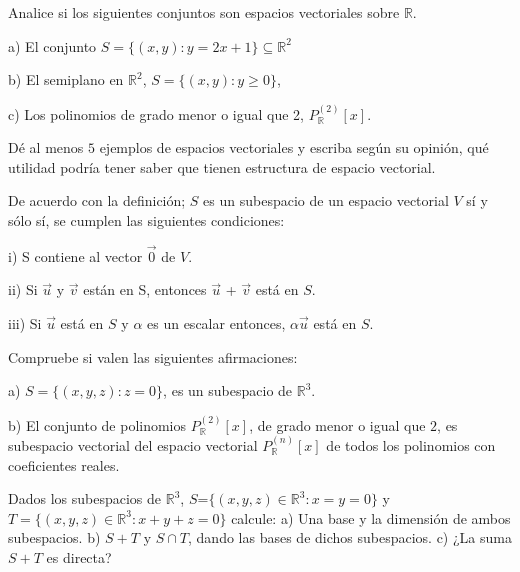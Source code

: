 \begin{exercise}
\item
Analice si los siguientes conjuntos son espacios vectoriales
sobre $\mathbb{R}$. 

a) El conjunto  $S=\{(x,y) : y=2x+1\}
\subseteq \mathbb{R}^2$

b) El semiplano en $\mathbb{R}^2$,  $S=\{(x,y) : y\geq 0\}$, 

c) Los polinomios de grado menor o igual que 2, $P^{(2)}_{\mathbb{R}}[x]$.

\end{exercise}



\begin{exercise}
\item
Dé al menos $5$ ejemplos de espacios vectoriales y escriba según su opinión, 
qué utilidad podría tener saber que tienen estructura de espacio vectorial.
\end{exercise}
\begin{exercise}
\item 

De acuerdo con la definición; $S$ es un subespacio de un espacio vectorial $V$ sí 
y sólo sí, se cumplen las siguientes condiciones:

i) S contiene al vector $\vec{0}$ de $V$.

ii) Si $\vec{u}$ y $\vec{v}$ están en S, entonces $\vec{u}$  + $\vec{v}$ está en $S$.

iii) Si $\vec{u}$ está en $S$ y $\alpha$ es un escalar entonces, $\alpha\vec{u}$ está en $S$.

\noindent Compruebe si valen las siguientes afirmaciones:

\noindent a) $S=\{(x,y,z) : z=0\}$, es un subespacio de $\mathbb{R}^3$.

\noindent b) El conjunto de polinomios $P^{(2)}_{\mathbb{R}}[x]$, de grado menor o igual que $2$, es subespacio vectorial del espacio vectorial 
$P^{(n)}_{\mathbb{R}}[x]$ de todos los polinomios con coeficientes reales.


\end{exercise}


\begin{exercise}
\item

Dados los subespacios de $\mathbb{R}^3$, $S$=$\{(x,y,z)\in \mathbb{R}^3: x=y=0\}$ y
$T=\{(x,y,z) \in \mathbb{R}^3: x+y+z=0\}$ calcule:
a) Una base y la dimensión de ambos subespacios.
b)  $S + T$ y $ S \cap T$, dando las bases de dichos subespacios.
c) ¿La suma $S + T$ es directa?
\end{exercise}

